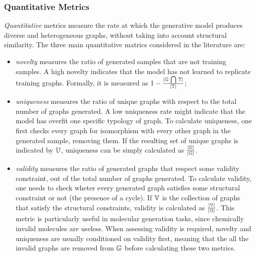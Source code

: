 \subsubsection*{Quantitative Metrics}
\emph{Quantitative} metrics measure the rate at which the generative model produces diverse and heterogeneous graphs, without taking into account structural similarity. The three main quantitative matrics considered in the literature are:
\begin{itemize}
    \item \emph{novelty} measures the ratio of generated samples that are not training samples. A high novelty indicates that the model has not learned to replicate training graphs. Formally, it is measured as $1 - \frac{|\mathbb{G} \,\bigcap\limits\, \mathbb{T}|}{|\mathbb{T}|}$;
    \item \emph{uniqueness} measures the ratio of unique graphs with respect to the total number of graphs generated. A low uniqueness rate might indicate that the model has overfit one specific typology of graph. To calculate uniqueness, one first checks every graph for isomorphism with every other graph in the generated sample, removing them. If the resulting set of unique graphs is indicated by $\mathbb{U}$, uniqueness can be simply calculated as $\frac{|\mathbb{U}|}{|\mathbb{G}|}$.
    \item \emph{validity} measures the ratio of generated graphs that respect some validity constraint, out of the total number of graphs generated. To calculate validity, one needs to check wheter every generated graph satisfies some structural constraint or not (\eg the presence of a cycle). If $\mathbb{V}$ is the collection of graphs that satisfy the structural constraints, validity is calculated as $\frac{|\mathbb{V}|}{|\mathbb{G}|}$. This metric is particularly useful in molecular generation tasks, since chemically invalid molecules are useless. When assessing validity is required, novelty and uniqueness are usually conditioned on validity first, meaning that the all the invalid graphs are removed from $\mathbb{G}$ before calculating these two metrics.
\end{itemize}

